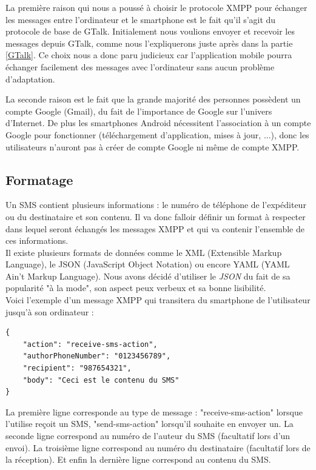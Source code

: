 La première raison qui nous a poussé à choisir le protocole XMPP pour échanger les messages entre l'ordinateur et le smartphone est le fait qu'il s'agit du protocole de base de GTalk.
Initialement nous voulions envoyer et recevoir les messages depuis GTalk, comme nous l'expliquerons juste après dans la partie \ref{GTalk}.
Ce choix nous a donc paru judicieux car l'application mobile pourra échanger facilement des messages avec l'ordinateur sans aucun problème d'adaptation.

La seconde raison est le fait que la grande majorité des personnes possèdent un compte Google (Gmail), du fait de l'importance de Google sur l'univers d'Internet.
De plus les smartphones Android nécessitent l'association à un compte Google pour fonctionner (téléchargement d'application, mises à jour, ...), donc les utilisateurs n'auront pas à créer de compte Google ni même de compte XMPP.




\subsection{Formatage}

Un SMS contient plusieurs informations : le numéro de téléphone de l'expéditeur ou du destinataire et son contenu.
Il va donc falloir définir un format à respecter dans lequel seront échangés les messages XMPP et qui va contenir l'ensemble de ces informations.
\\


Il existe plusieurs formats de données comme le XML (Extensible Markup Language), le JSON (JavaScript Object Notation) ou encore YAML (YAML Ain't Markup Language).
Nous avons décidé d'utiliser le \textit{JSON} du fait de sa popularité "à la mode", son aspect peux verbeux et sa bonne lisibilité.
\\


Voici l'exemple d'un message XMPP qui transitera du smartphone de l'utilisateur jusqu'à son ordinateur :
\begin{lstlisting}
{
    "action": "receive-sms-action",
    "authorPhoneNumber": "0123456789",
    "recipient": "987654321",
    "body": "Ceci est le contenu du SMS"
}
\end{lstlisting}
La première ligne corresponde au type de message : "receive-sms-action" lorsque l'utilise reçoit un SMS, "send-sms-action" lorsqu'il souhaite en envoyer un.
La seconde ligne correspond au numéro de l'auteur du SMS (facultatif lors d'un envoi).
La troisième ligne correspond au numéro du destinataire (facultatif lors de la réception).
Et enfin la dernière ligne correspond au contenu du SMS.



